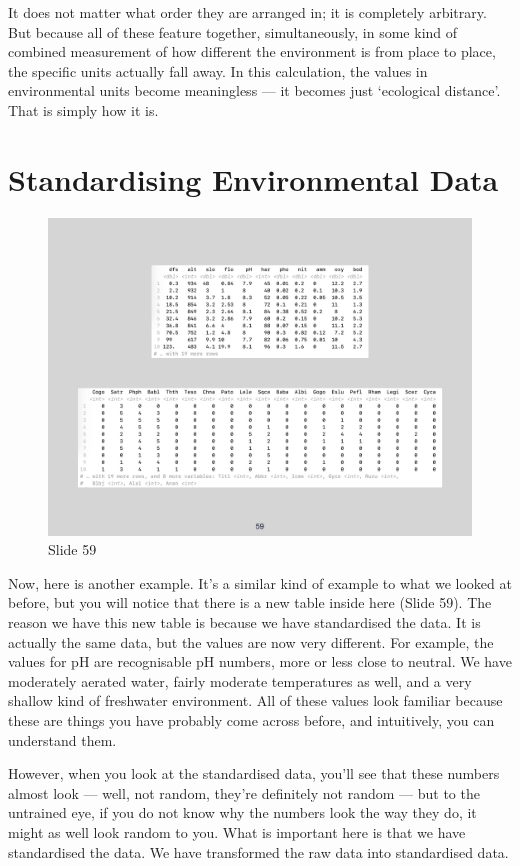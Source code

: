 \documentclass[
  10pt,
]{book}
\begin{document}
It does not matter what order they are arranged in; it is completely
arbitrary. But because all of these feature together, simultaneously, in
some kind of combined measurement of how different the environment is
from place to place, the specific units actually fall away. In this
calculation, the values in environmental units become meaningless --- it
becomes just `ecological distance'. That is simply how it is.

\section{Standardising Environmental
Data}\label{standardising-environmental-data}

\begin{figure}[ht]
\centering
\includegraphics[width=0.8\linewidth]{../images/BDC334/BDC334-059.jpeg}
\caption*{Slide 59}
\end{figure}

Now, here is another example. It's a similar kind of example to what we
looked at before, but you will notice that there is a new table inside
here (Slide 59). The reason we have this new table is because we have
standardised the data. It is actually the same data, but the values are
now very different. For example, the values for pH are recognisable pH
numbers, more or less close to neutral. We have moderately aerated
water, fairly moderate temperatures as well, and a very shallow kind of
freshwater environment. All of these values look familiar because these
are things you have probably come across before, and intuitively, you
can understand them.

However, when you look at the standardised data, you'll see that these
numbers almost look --- well, not random, they're definitely not random
--- but to the untrained eye, if you do not know why the numbers look
the way they do, it might as well look random to you. What is important
here is that we have standardised the data. We have transformed the raw
data into standardised data.
\end{document}
